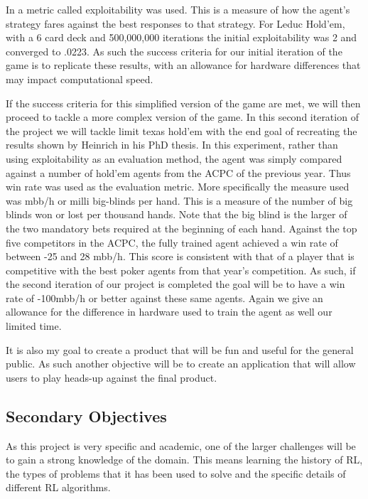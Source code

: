 In\citep{heinrich2015smooth} a metric called exploitability was used.
This is a measure of how the agent's strategy fares against the best responses to that strategy.
For Leduc Hold'em, with a 6 card deck and 500,000,000 iterations the initial exploitability was 2 and converged
to .0223.
As such the success criteria for our initial iteration of the game is to replicate these results, with an
allowance for hardware differences that may impact computational speed.

If the success criteria for this simplified version of the game are met, we will then proceed to tackle
a more complex version of the game.
In this second iteration of the project we will tackle limit texas hold'em with the end goal of recreating
the results shown by Heinrich in his PhD thesis\citep{heinrich2017reinforcement}.
In this experiment, rather than using exploitability as an evaluation method, the agent was simply compared
against a number of hold'em agents from the ACPC of the previous year.
Thus win rate was used as the evaluation metric.
More specifically the measure used was mbb/h or milli big-blinds per hand.
This is a measure of the number of big blinds won or lost per thousand hands.
Note that the big blind is the larger of the two mandatory bets required at the beginning of each hand.
Against the top five competitors in the ACPC, the fully trained agent achieved a win rate of between
-25 and 28 mbb/h.
This score is consistent with that of a player that is competitive with the best poker agents from that
year's competition.
As such, if the second iteration of our project is completed the goal will be to have a win rate of -100mbb/h
or better against these same agents.
Again we give an allowance for the difference in hardware used to train the agent as well our limited time.

It is also my goal to create a product that will be fun and useful for the general public.
As such another objective will be to create an application that will allow users to play heads-up against the final product.

\subsection{Secondary Objectives}\label{subsec:secondaryObjectives}
As this project is very specific and academic, one of the larger challenges will be to gain a strong knowledge
of the domain.
This means learning the history of RL, the types of problems that it has been used to solve and the specific details of
different RL algorithms.

